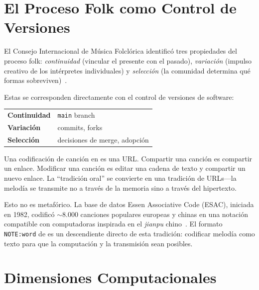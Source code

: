 \documentclass[11pt]{article}
\begin{document}
\section{El Proceso Folk como Control de Versiones}

El Consejo Internacional de Música Folclórica identificó tres propiedades del proceso folk: \emph{continuidad} (vincular el presente con el pasado), \emph{variación} (impulso creativo de los intérpretes individuales) y \emph{selección} (la comunidad determina qué formas sobreviven)~\citep{karpeles1955definition}.

\begin{accentcard}
Estas se corresponden directamente con el control de versiones de software:

\vspace{0.3em}
\begin{tabularx}{\linewidth}{lX}
\textbf{Continuidad} & \texttt{main} branch \\
\textbf{Variación} & commits, forks \\
\textbf{Selección} & decisiones de merge, adopción \\
\end{tabularx}
\end{accentcard}

Una codificación de canción en \np{} es una URL. Compartir una canción es compartir un enlace. Modificar una canción es editar una cadena de texto y compartir un nuevo enlace. La ``tradición oral'' se convierte en una tradición de URLs---la melodía se transmite no a través de la memoria sino a través del hipertexto.

Esto no es metafórico. La base de datos Essen Associative Code (ESAC), iniciada en 1982, codificó $\sim$8.000 canciones populares europeas y chinas en una notación compatible con computadoras inspirada en el \textit{jianpu} chino~\citep{schaffrath1995esac}. El formato \texttt{NOTE:word} de \np{} es un descendiente directo de esta tradición: codificar melodía como texto para que la computación y la transmisión sean posibles.

\section{Dimensiones Computacionales}
\end{document}
